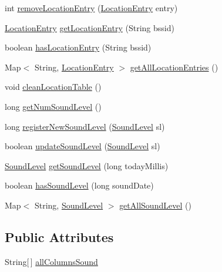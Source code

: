 \begin{DoxyCompactItemize}
\item 
int \hyperlink{classcs_1_1usense_1_1db_1_1_usense_data_source_a8b72c3ef4cce8d4535034fb5f7a3b6dc}{remove\+Location\+Entry} (\hyperlink{classcs_1_1usense_1_1location_1_1_location_entry}{Location\+Entry} entry)
\item 
\hyperlink{classcs_1_1usense_1_1location_1_1_location_entry}{Location\+Entry} \hyperlink{classcs_1_1usense_1_1db_1_1_usense_data_source_abda578af60b176eedda9cd90ceed2dfc}{get\+Location\+Entry} (String bssid)
\item 
boolean \hyperlink{classcs_1_1usense_1_1db_1_1_usense_data_source_a346a0f88cfeff37a187c0b010c0542a7}{has\+Location\+Entry} (String bssid)
\item 
Map$<$ String, \hyperlink{classcs_1_1usense_1_1location_1_1_location_entry}{Location\+Entry} $>$ \hyperlink{classcs_1_1usense_1_1db_1_1_usense_data_source_a7109548f119f84053a54e571d51339ae}{get\+All\+Location\+Entries} ()
\item 
void \hyperlink{classcs_1_1usense_1_1db_1_1_usense_data_source_a5913e07ca828a258cef9b9c421ecb0ce}{clean\+Location\+Table} ()
\item 
long \hyperlink{classcs_1_1usense_1_1db_1_1_usense_data_source_a7f08dba29d26ca8d33a5eda2714640fb}{get\+Num\+Sound\+Level} ()
\item 
long \hyperlink{classcs_1_1usense_1_1db_1_1_usense_data_source_a88dd2b18825241d4946ede0353b4fd26}{register\+New\+Sound\+Level} (\hyperlink{classcs_1_1usense_1_1microphone_1_1_sound_level}{Sound\+Level} sl)
\item 
boolean \hyperlink{classcs_1_1usense_1_1db_1_1_usense_data_source_a079854050c01f42e4bc2dd03f659eba3}{update\+Sound\+Level} (\hyperlink{classcs_1_1usense_1_1microphone_1_1_sound_level}{Sound\+Level} sl)
\item 
\hyperlink{classcs_1_1usense_1_1microphone_1_1_sound_level}{Sound\+Level} \hyperlink{classcs_1_1usense_1_1db_1_1_usense_data_source_ae9c1bce7d6fa9b86dc0ab01f4acebf09}{get\+Sound\+Level} (long today\+Millis)
\item 
boolean \hyperlink{classcs_1_1usense_1_1db_1_1_usense_data_source_a626b15f5c0c222e54e13e0667e3fd579}{has\+Sound\+Level} (long sound\+Date)
\item 
Map$<$ String, \hyperlink{classcs_1_1usense_1_1microphone_1_1_sound_level}{Sound\+Level} $>$ \hyperlink{classcs_1_1usense_1_1db_1_1_usense_data_source_a66b812c9d52996f0b3e670e2e67114a4}{get\+All\+Sound\+Level} ()
\end{DoxyCompactItemize}
\subsection*{Public Attributes}
\begin{DoxyCompactItemize}
\item 
String\mbox{[}$\,$\mbox{]} \hyperlink{classcs_1_1usense_1_1db_1_1_usense_data_source_a974d57d1a21d3d3d4769d6ad8be5d15e}{all\+Columns\+Sound}
\end{DoxyCompactItemize}
